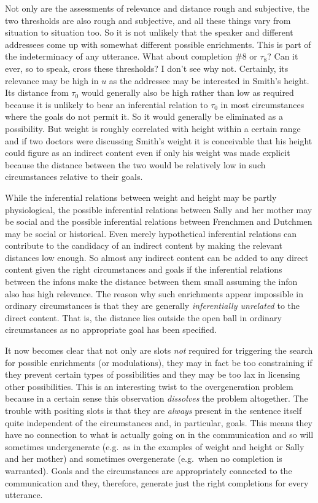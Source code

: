 Not only are the assessments of relevance and distance rough and subjective, the two thresholds are also rough and subjective, and all these things vary from situation to situation too. So it is not unlikely that the speaker and different addressees come up with somewhat different possible enrichments. This is part of the indeterminacy of any utterance. What about completion \#8 or $\tau_{8}$? Can it ever, so to speak, cross these thresholds? I don't see why not. Certainly, its relevance may be high in $u$ as the addressee may be interested in Smith's height. Its distance from $\tau_{0}$ would generally also be high rather than low as required because it is unlikely to bear an inferential relation to $\tau_{0}$ in most circumstances where the goals do not permit it. So it would generally be eliminated as a possibility. But weight is roughly correlated with height within a certain range and if two doctors were discussing Smith's weight it is conceivable that his height could figure as an indirect content even if only his weight was made explicit because the distance between the two would be relatively low in such circumstances relative to their goals. 

While the inferential relations between weight and height may be partly physiological, the possible inferential relations between Sally and her mother may be social and the possible inferential relations between Frenchmen and Dutchmen may be social or historical. Even merely hypothetical inferential relations can contribute to the candidacy of an indirect content by making the relevant distances low enough. So almost any indirect content can be added to any direct content given the right circumstances and goals if the inferential relations between the infons make the distance between them small assuming the infon also has high relevance. The reason why such enrichments appear impossible in ordinary circumstances is that they are generally \emph{inferentially unrelated} to the direct content. That is, the distance lies outside the open ball in ordinary circumstances as no appropriate goal has been specified.

It now becomes clear that not only are slots \emph{not} required for triggering the search for possible enrichments (or modulations), they may in fact be too constraining if they prevent certain types of possibilities and they may be too lax in  licensing other possibilities. This is an interesting twist to the overgeneration problem because in a certain sense this observation \emph{dissolves} the problem altogether. The trouble with positing slots is that they are \emph{always} present in the sentence itself quite independent of the circumstances and, in particular, goals. This means they have no connection to what is actually going on in the communication and so will sometimes undergenerate (e.g.\ as in the examples of weight and height or Sally and her mother) and sometimes overgenerate (e.g.\ when no completion is warranted). Goals and the circumstances are appropriately connected to the communication and they, therefore, generate just the right completions for every utterance.

